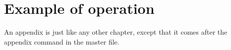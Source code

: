 \chapter{Example of operation}

An appendix is just like any other chapter, except that it comes after
the appendix command in the master file.

%
%
%
% 
%
%
% 
%
% 

